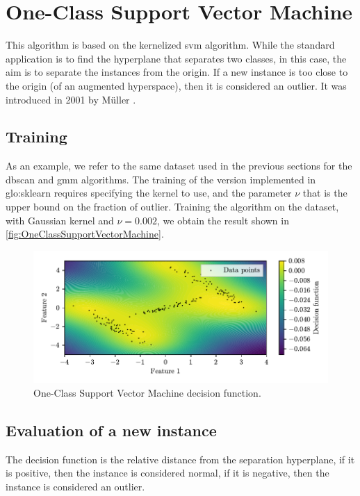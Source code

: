 \section{One-Class Support Vector Machine}
\label{sec:OneClassSupportVectorMachine}

This algorithm is based on the kernelized \gls{svm} algorithm. While the standard application is to find the hyperplane that separates two classes, in this case, the aim is to separate the instances from the origin. If a new instance is too close to the origin (of an augmented hyperspace), then it is considered an outlier. It was introduced in 2001 by M\"{u}ller \cite{mullerOneClassSVM}.

\subsection{Training}
As an example, we refer to the same dataset used in the previous sections for the \gls{dbscan} and {\gls{gmm}} algorithms. The training of the version implemented in \gls{glo:sklearn} requires specifying the kernel to use, and the parameter $\nu$ that is the upper bound on the fraction of outlier. Training the algorithm on the dataset, with Gaussian kernel and $\nu=0.002$, we obtain the result shown in \autoref{fig:OneClassSupportVectorMachine}. 

\begin{figure}
    \centering
    \includegraphics{images/nuSVM/Figure_1.pdf}
    \caption{One-Class Support Vector Machine decision function.}
    \label{fig:OneClassSupportVectorMachine}
\end{figure}

\subsection{Evaluation of a new instance}
\label{sec:svm_eval}
The decision function is the relative distance from the separation hyperplane, if it is positive, then the instance is considered normal, if it is negative, then the instance is considered an outlier. 

